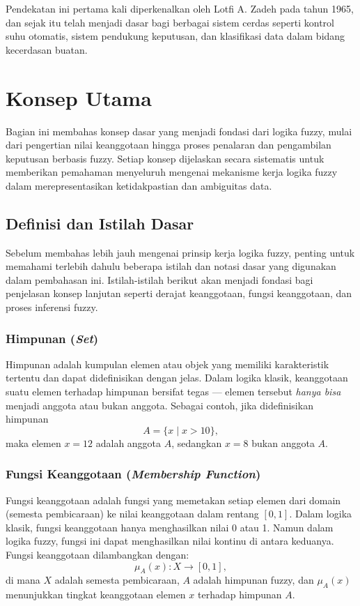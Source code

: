 \documentclass[12pt,a4paper]{article}
\theoremstyle{remark}
\begin{document}
Pendekatan ini pertama kali diperkenalkan oleh Lotfi A. Zadeh pada tahun 1965,
dan sejak itu telah menjadi dasar bagi berbagai sistem cerdas
seperti kontrol suhu otomatis, sistem pendukung keputusan, dan klasifikasi data
dalam bidang kecerdasan buatan.

\section{Konsep Utama}

Bagian ini membahas konsep dasar yang menjadi fondasi dari logika fuzzy, mulai dari pengertian nilai keanggotaan hingga proses penalaran dan pengambilan keputusan berbasis fuzzy. Setiap konsep dijelaskan secara sistematis untuk memberikan pemahaman menyeluruh mengenai mekanisme kerja logika fuzzy dalam merepresentasikan ketidakpastian dan ambiguitas data.

\subsection{Definisi dan Istilah Dasar}

Sebelum membahas lebih jauh mengenai prinsip kerja logika fuzzy, penting untuk memahami terlebih dahulu beberapa istilah dan notasi dasar yang digunakan dalam pembahasan ini. Istilah-istilah berikut akan menjadi fondasi bagi penjelasan konsep lanjutan seperti derajat keanggotaan, fungsi keanggotaan, dan proses inferensi fuzzy.

\subsubsection{Himpunan (\textit{Set})}
Himpunan adalah kumpulan elemen atau objek yang memiliki karakteristik tertentu dan dapat didefinisikan dengan jelas. Dalam logika klasik, keanggotaan suatu elemen terhadap himpunan bersifat tegas — elemen tersebut \textit{hanya bisa} menjadi anggota atau bukan anggota.
Sebagai contoh, jika didefinisikan himpunan
\[
    A = \{x \mid x > 10\},
\]
maka elemen \(x = 12\) adalah anggota \(A\), sedangkan \(x = 8\) bukan anggota \(A\).

\subsubsection{Fungsi Keanggotaan (\textit{Membership Function})}
Fungsi keanggotaan adalah fungsi yang memetakan setiap elemen dari domain (semesta pembicaraan) ke nilai keanggotaan dalam rentang \([0,1]\). Dalam logika klasik, fungsi keanggotaan hanya menghasilkan nilai 0 atau 1. Namun dalam logika fuzzy, fungsi ini dapat menghasilkan nilai kontinu di antara keduanya.
Fungsi keanggotaan dilambangkan dengan:
\[
    \mu_A(x) : X \rightarrow [0,1],
\]
di mana \(X\) adalah semesta pembicaraan, \(A\) adalah himpunan fuzzy, dan \(\mu_A(x)\) menunjukkan tingkat keanggotaan elemen \(x\) terhadap himpunan \(A\).
\end{document}
